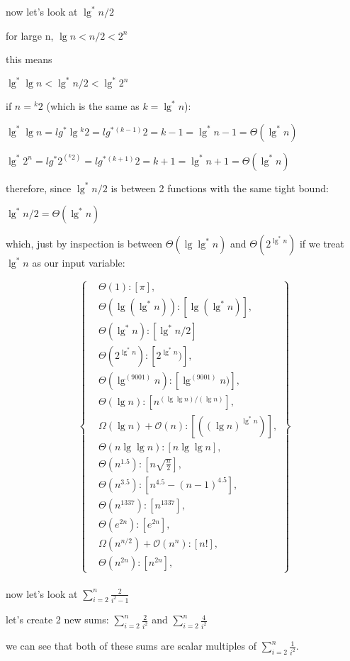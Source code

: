 \documentclass[11pt,fleqn]{article}
\theoremstyle{definition}
\theoremstyle{remark}
\begin{document}
now let's look at $\lg^*{n/2}$

for large n, $\lg n < n/2 < 2^n$

this means

$\lg^* \lg n < \lg^* n/2 < \lg^* 2^n$

if $n = {}^k 2$ (which is the same as $k = \lg^* n$):

$\lg^* \lg n = lg^* \lg {}^k 2 = lg^* {}^{(k-1)} 2 = k-1 = \lg^* n - 1 = \Theta(\lg^* n)$

$\lg^* 2^n = lg^* 2^{({}^k 2)} = lg^* {}^{(k+1)} 2 = k+1 = \lg^* n + 1 = \Theta(\lg^* n)$

therefore, since $\lg^* n/2$ is between 2 functions with the same tight bound:

$\lg^* n/2 = \Theta(\lg^* n)$

which, just by inspection is between $\Theta(\lg \lg^* n)$ and $\Theta(2^{\lg^* n})$ if we 
treat $\lg^* n$ as our input variable:

\[
\left\{
\begin{aligned}
& \Theta(1): [\pi],\\
& \Theta(\lg(\lg^*n)): [\lg(\lg^*n)],\\
& \Theta(\lg^* n): [\lg^* n/2]\\
& \Theta(2^{\lg^*n}): [2^{\lg^*n})],\\
& \Theta(\lg^{(9001)} n): [\lg^{(9001)} n)],\\
& \Theta(\lg n): [n^{({\lg \lg n})/({\lg n})}],\\
& \Omega(\lg n) + \mathcal{O}(n): [({(\lg n)}^{\lg^*{n}})],\\
& \Theta(n\lg \lg n): [n\lg \lg n],\\
& \Theta(n^{1.5}): [n\sqrt{\frac{n}{2}}],\\
& \Theta(n^{3.5}): [n^{4.5} - (n - 1)^{4.5}],\\ 
& \Theta(n^{1337}): [n^{1337}],\\
& \Theta(e^{2n}): [e^{2n}],\\
& \Omega(n^{n/2}) + \mathcal{O}(n^n): [n!],\\
& \Theta(n^{2n}): [n^{2n}],
\end{aligned}
\right\}
\]\\

now let's look at $\sum_{i=2}^{n} \frac{2}{i^2 - 1}$

let's create 2 new sums: $\sum_{i=2}^{n} \frac{2}{i^2}$ and $\sum_{i=2}^{n} \frac{4}{i^2}$

we can see that both of these sums are scalar multiples of 
$\sum_{i=2}^{n} \frac{1}{i^2}$.
\end{document}
